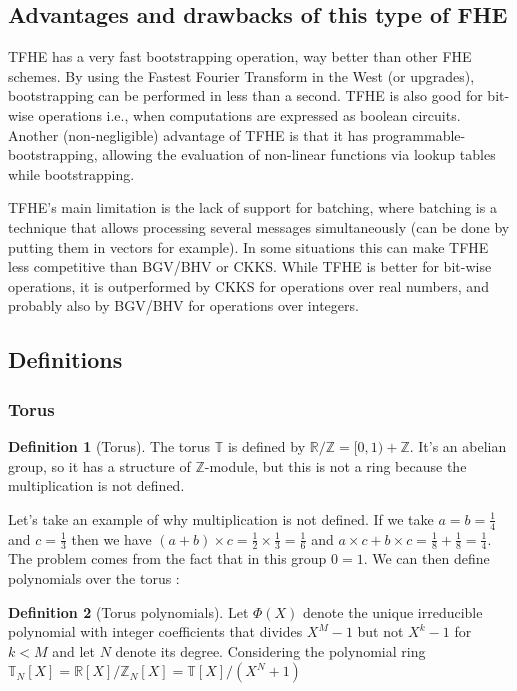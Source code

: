 \documentclass{article}
\newcommand{\Z}{\mathbb{Z}}
\newcommand{\R}{\mathbb{R}}
\newcommand{\T}{\mathbb{T}}
\theoremstyle{definition}
\newtheorem{definition}{Definition}[section]
\theoremstyle{Theorem}
\begin{document}
\subsection{Advantages and drawbacks of this type of FHE}

TFHE \cite{tfhe} has a very fast bootstrapping operation, way better than other FHE schemes. By using the Fastest Fourier Transform in the West (or upgrades), bootstrapping can be performed in less than a second. TFHE is also good for bit-wise operations i.e., when computations are expressed as boolean circuits. Another (non-negligible) advantage of TFHE is that it has programmable-bootstrapping, allowing the evaluation of non-linear functions via lookup tables while bootstrapping. 

TFHE's main limitation is the lack of support for batching, where batching is a technique that allows processing several messages simultaneously (can be done by putting them in vectors for example). In some situations this can make TFHE less competitive than BGV/BHV or CKKS. While TFHE is better for bit-wise operations, it is outperformed by CKKS for operations over real numbers, and probably also by BGV/BHV for operations over integers.\cite{survey_marcolla}

\subsection{Definitions}

\subsubsection{Torus}
\begin{definition}[Torus]
    The torus $\T$ is defined by $\R/\Z = [0,1) +\Z$. It's an abelian group, so it has a structure of $\Z$-module, but this is not a ring because the multiplication is not defined.
\end{definition}

Let's take an example of why multiplication is not defined. If we take $a=b=\frac{1}{4}$ and $c=\frac{1}{3}$ then we have $(a+b)\times c = \frac{1}{2} \times \frac{1}{3} = \frac{1}{6}$ and $a\times c + b \times c = \frac{1}{8} + \frac{1}{8} = \frac{1}{4}$. The problem comes from the fact that in this group $0=1$. We can then define polynomials over the torus :

\begin{definition}[Torus polynomials]
    Let $\Phi(X)$ denote the unique irreducible polynomial with integer coefficients that divides $X^M-1$ but not $X^k-1$ for $k<M$ and let $N$ denote its degree. 
    Considering the polynomial ring $\T_N[X]=\R[X]/\Z_N[X] = \T[X]/(X^N+1)$
\end{definition}
\end{document}
